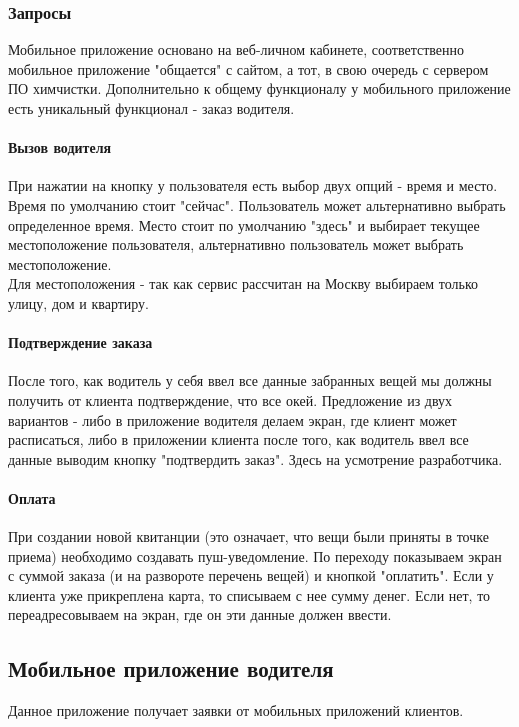 \documentclass[DIV=calc, paper=a4, fontsize=11pt]{scrartcl} %
\begin{document}
\subsubsection{Запросы}
Мобильное приложение основано на веб-личном кабинете, соответственно мобильное приложение "общается" с сайтом, а тот, в свою очередь с сервером ПО химчистки. Дополнительно к общему функционалу у мобильного приложение есть уникальный функционал - заказ водителя.

\paragraph{Вызов водителя}
При нажатии на кнопку у пользователя есть выбор двух опций - время и место. Время по умолчанию стоит "сейчас". Пользователь может альтернативно выбрать определенное время. Место стоит по умолчанию "здесь" и выбирает текущее местоположение пользователя, альтернативно пользователь может выбрать местоположение.
\\[0.5cm]
Для местоположения - так как сервис рассчитан на Москву выбираем только улицу, дом и квартиру.

\paragraph{Подтверждение заказа}
После того, как водитель у себя ввел все данные забранных вещей мы должны получить от клиента подтверждение, что все окей. Предложение из двух вариантов - либо в приложение водителя делаем экран, где клиент может расписаться, либо в приложении клиента после того, как водитель ввел все данные выводим кнопку "подтвердить заказ". Здесь на усмотрение разработчика.

\paragraph{Оплата}
При создании новой квитанции (это означает, что вещи были приняты в точке приема) необходимо создавать пуш-уведомление. По переходу показываем экран с суммой заказа (и на развороте перечень вещей) и кнопкой "оплатить". Если у клиента уже прикреплена карта, то списываем с нее сумму денег. Если нет, то переадресовываем на экран, где он эти данные должен ввести.

\subsection{Мобильное приложение водителя}
Данное приложение получает заявки от мобильных приложений клиентов. 
\end{document}
